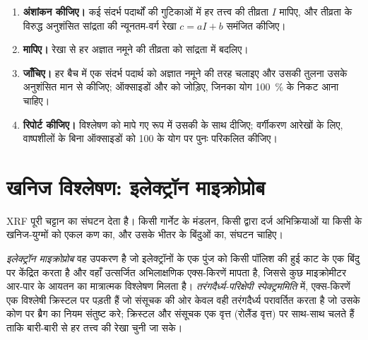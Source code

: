 \begin{method}[संपूर्ण-शैल विश्लेषण का अंशांकन और जाँच]\label{met:b2:field-lab-methods-2:calibration}
\begin{enumerate}
  \item \textbf{अंशांकन कीजिए।} कई संदर्भ पदार्थों की गुटिकाओं में हर तत्त्व की तीव्रता $I$ मापिए,
        और तीव्रता के विरुद्ध अनुशंसित सांद्रता की न्यूनतम-वर्ग रेखा $c = aI + b$
        समंजित कीजिए।
  \item \textbf{मापिए।} रेखा से हर अज्ञात नमूने की तीव्रता को सांद्रता में बदलिए।
  \item \textbf{जाँचिए।} हर बैच में एक संदर्भ पदार्थ को अज्ञात नमूने की तरह चलाइए और उसकी तुलना
        उसके अनुशंसित मान से कीजिए; ऑक्साइडों और  को जोड़िए, जिनका योग
        \qty{100}{\percent} के निकट आना चाहिए।
  \item \textbf{रिपोर्ट कीजिए।} विश्लेषण को मापे गए रूप में उसकी  के साथ दीजिए;
        वर्गीकरण आरेखों के लिए, वाष्पशीलों के बिना ऑक्साइडों को 100 के योग पर पुनः परिकलित कीजिए।
\end{enumerate}
\end{method}

\section{खनिज विश्लेषण: इलेक्ट्रॉन माइक्रोप्रोब}\label{sec:b2:field-lab-methods-2:microprobe}

XRF पूरी चट्टान का संघटन देता है। किसी गार्नेट  के मंडलन, किसी  द्वारा दर्ज
अभिक्रियाओं या किसी  के खनिज-युग्मों को एकल
कण का, और उसके भीतर के बिंदुओं का, संघटन चाहिए।

\begin{definition}[इलेक्ट्रॉन माइक्रोप्रोब, तरंगदैर्ध्य-परिक्षेपी स्पेक्ट्रममिति]\label{def:b2:field-lab-methods-2:epma}
\emph{इलेक्ट्रॉन माइक्रोप्रोब} वह उपकरण है जो इलेक्ट्रॉनों के एक पुंज को
किसी पॉलिश की हुई काट के एक बिंदु पर केंद्रित करता है और वहाँ उत्सर्जित अभिलाक्षणिक एक्स-किरणें मापता है,
जिससे कुछ माइक्रोमीटर आर-पार के आयतन का मात्रात्मक विश्लेषण मिलता है।
\emph{तरंगदैर्ध्य-परिक्षेपी स्पेक्ट्रममिति} में, एक्स-किरणें
एक विश्लेषी क्रिस्टल पर पड़ती हैं जो संसूचक की ओर केवल वही तरंगदैर्ध्य परावर्तित करता है जो उसके कोण पर ब्रैग का नियम
संतुष्ट करे; क्रिस्टल और संसूचक एक वृत्त (रोलैंड वृत्त) पर साथ-साथ चलते हैं ताकि बारी-बारी से हर
तत्त्व की रेखा चुनी जा सके।
\end{definition}

